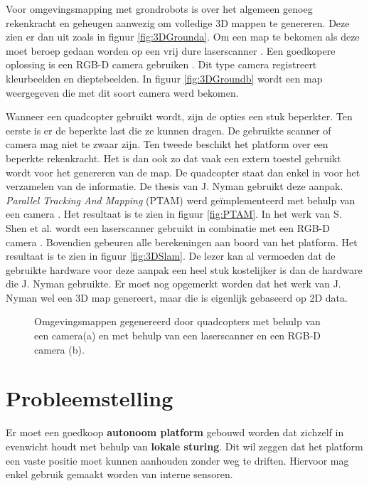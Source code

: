 \npar Voor omgevingsmapping met grondrobots is over het algemeen genoeg rekenkracht en geheugen aanwezig om volledige 3D mappen te genereren. Deze zien er dan uit zoals in figuur \ref{fig:3DGrounda}. Om een map te bekomen als deze moet beroep gedaan worden op een vrij dure laserscanner \cite{paper:3DGround2}. Een goedkopere oplossing is een RGB-D camera gebruiken \cite{paper:3DGround}. Dit type camera registreert kleurbeelden en dieptebeelden. In figuur \ref{fig:3DGroundb} wordt een map weergegeven die met dit soort camera werd bekomen.

\npar Wanneer een quadcopter gebruikt wordt, zijn de opties een stuk beperkter. Ten eerste is er de beperkte last die ze kunnen dragen. De gebruikte scanner of camera mag niet te zwaar zijn. Ten tweede beschikt het platform over een beperkte rekenkracht. Het is dan ook zo dat vaak een extern toestel gebruikt wordt voor het genereren van de map. De quadcopter staat dan enkel in voor het verzamelen van de informatie. De thesis van J. Nyman  gebruikt deze aanpak. \textit{Parallel Tracking And Mapping} (PTAM) werd ge\"implementeerd met behulp van een camera \cite{thesis:jens}. Het resultaat is te zien in figuur \ref{fig:PTAM}. In het werk van S. Shen et al. wordt een laserscanner gebruikt in combinatie met een RGB-D camera \cite{paper:3DQuad} . Bovendien gebeuren alle berekeningen aan boord van het platform. Het resultaat is te zien in figuur \ref{fig:3DSlam}. De lezer kan al vermoeden dat de gebruikte hardware voor deze aanpak een heel stuk kostelijker is dan de hardware die J. Nyman gebruikte. Er moet nog opgemerkt worden dat het werk van J. Nyman wel een 3D map genereert, maar die is eigenlijk gebaseerd op 2D data.

\begin{figure}[h]
	\centering
	\hspace{0.01\linewidth}
	\caption{Omgevingsmappen gegenereerd door quadcopters met behulp van een camera(a) en met behulp van een laserscanner en een RGB-D camera (b).}
\end{figure}


\section{Probleemstelling}
Er moet een goedkoop \textbf{autonoom platform} gebouwd worden dat zichzelf in evenwicht houdt met behulp van \textbf{lokale sturing}. Dit wil zeggen dat het platform een vaste positie moet kunnen aanhouden zonder weg te driften. Hiervoor mag enkel gebruik gemaakt worden van interne sensoren.

